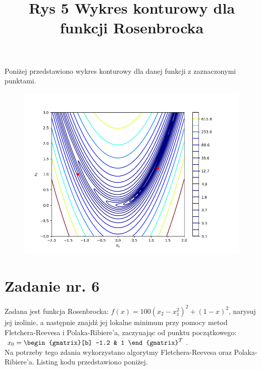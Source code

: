 \documentclass{article}
\begin{document}
Poniżej przedstawiono wykres konturowy dla danej funkcji z zaznaczonymi punktami.
\begin{figure}[h]
  \includegraphics[scale=0.5]{Zad5.png}
  \title{Rys 5 Wykres konturowy dla funkcji Rosenbrocka}
  \centering
\end{figure}
\section{Zadanie nr. 6}

Zadana jest funkcja Rosenbrocka: $f(x)=100(x_2-x_1^2)^2+(1-x)^2$, narysuj
jej izolinie, a następnie znajdź jej lokalne minimum przy pomocy metod Fletchera-Reevesa
i Polaka-Ribiere'a, zaczynając od punktu początkowego: $x_0=\begin{gmatrix}[b]
  -1.2 & 1
\end{gmatrix}^T$.\\

Na potrzeby tego zdania wykorzystano algorytmy Fletchera-Reevesa
oraz Polaka-Ribiere’a. Listing kodu przedstawiono poniżej.
\end{document}
